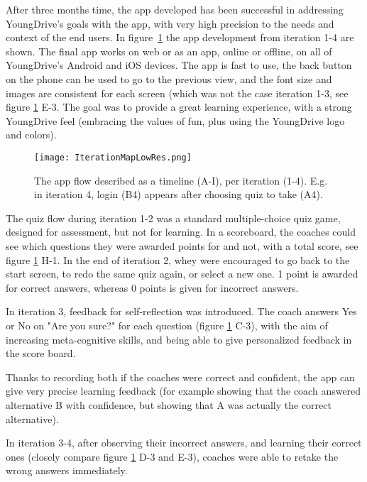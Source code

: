 After three months time, the app developed has been successful in addressing YoungDrive's goals with the app, with very high precision to the needs and context of the end users. In figure~\ref{fig:iteration-map} the app development from iteration 1-4 are shown. The final app works on web or as an app, online or offline, on all of YoungDrive's Android and iOS devices. The app is fast to use, the back button on the phone can be used to go to the previous view, and the font size and images are consistent for each screen (which was not the case iteration 1-3, see figure \ref{fig:iteration-map} E-3. The goal was to provide a great learning experience, with a strong YoungDrive feel (embracing the values of fun, plus using the YoungDrive logo and colors).

  \begin{figure}[h]
    \centering
    \texttt{[image: IterationMapLowRes.png]}
    \caption{The app flow described as a timeline (A-I), per iteration (1-4). E.g. in iteration 4, login (B4) appears after choosing quiz to take (A4).}
    \label{fig:iteration-map}
  \end{figure}


  The quiz flow during iteration 1-2 was a standard multiple-choice quiz game, designed for assessment, but not for learning. In a scoreboard, the coaches could see which questions they were awarded points for and not, with a total score, see figure \ref{fig:iteration-map} H-1. In the end of iteration 2, whey were encouraged to go back to the start screen, to redo the same quiz again, or select a new one. 1 point is awarded for correct answers, whereas 0 points is given for incorrect answers.

  In iteration 3, feedback for self-reflection was introduced. The coach answers Yes or No on "Are you sure?" for each question (figure \ref{fig:iteration-map} C-3), with the aim of increasing meta-cognitive skills, and being able to give personalized feedback in the score board.

  Thanks to recording both if the coaches were correct and confident, the app can give very precise learning feedback (for example showing that the coach answered alternative B with confidence, but showing that A was actually the correct alternative).

  In iteration 3-4, after observing their incorrect answers, and learning their correct ones (closely compare figure \ref{fig:iteration-map} D-3 and E-3), coaches were able to retake the wrong answers immediately.

